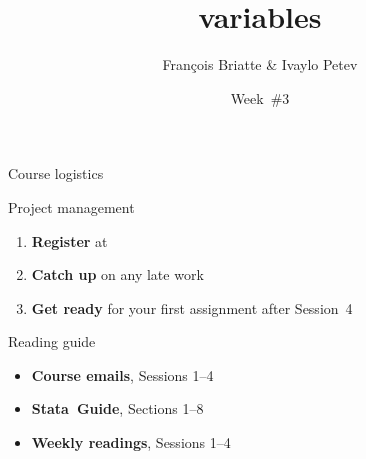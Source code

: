 \documentclass[t]{beamer}
\title{variables}
\author{François Briatte \& Ivaylo Petev}
\date{Week~\#3}
\begin{document}

	\begin{frame}[t]{Course logistics}

    \begin{block}{Project management}
      \begin{enumerate}
        \item \textbf{Register} at %
        \item \textbf{Catch up} on any late work
        \item \textbf{Get ready} for your first assignment after Session 4
      \end{enumerate}
    \end{block}

    \begin{alertblock}{Reading guide}
      \begin{itemize}
	      \item \textbf{Course emails}, Sessions 1--4
        \item \textbf{Stata~Guide}, Sections 1--8%
	      \item \textbf{Weekly readings}, Sessions 1--4
      \end{itemize}
    \end{alertblock}
    		
	\end{frame}
\end{document}
